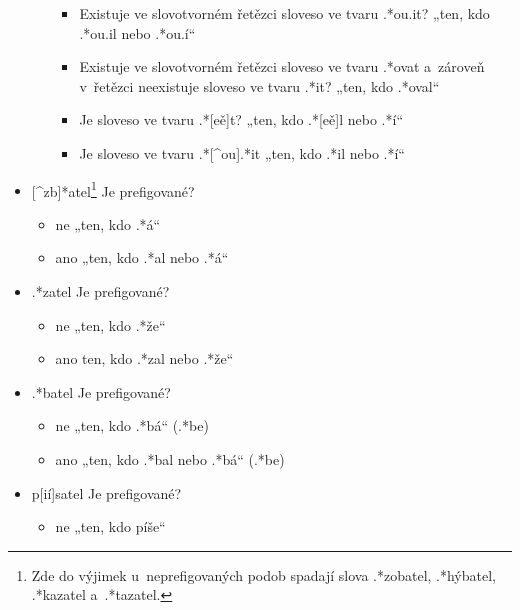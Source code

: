\begin{itemize}
\begin{itemize}
    \begin{itemize}
    \tightlist
    \item
      Existuje ve slovotvorném řetězci sloveso ve tvaru .*ou.it?
      \rightarrow „ten, kdo .*ou.il nebo .*ou.í``
    \item
      Existuje ve slovotvorném řetězci sloveso ve tvaru .*ovat a~zároveň
      v~řetězci neexistuje sloveso ve tvaru .*it? \rightarrow „ten,
      kdo .*oval``
    \item
      Je sloveso ve tvaru .*{[}eě{]}t? \rightarrow „ten, kdo
      .*{[}eě{]}l nebo .*í``
    \item
      Je sloveso ve tvaru .*{[}\^{}ou{]}.*it \rightarrow „ten, kdo
      .*il nebo .*í``
    \end{itemize}
  \end{itemize}
\item
  {[}\^{}zb{]}*atel\footnote{Zde do výjimek u~neprefigovaných podob spadají slova .*zobatel, .*hýbatel, .*kazatel a~.*tazatel.}
  \rightarrow Je prefigované?

  \begin{itemize}
  \tightlist
  \item
    ne \rightarrow „ten, kdo .*á``
  \item
    ano \rightarrow „ten, kdo .*al nebo .*á``
  \end{itemize}
\item
  .*zatel \rightarrow Je prefigované?

  \begin{itemize}
  \tightlist
  \item
    ne \rightarrow „ten, kdo .*že``
  \item
    ano \rightarrow ten, kdo .*zal nebo .*že``
  \end{itemize}
\item
  .*batel \rightarrow Je prefigované?

  \begin{itemize}
  \tightlist
  \item
    ne \rightarrow „ten, kdo .*bá`` (.*be)
  \item
    ano \rightarrow „ten, kdo .*bal nebo .*bá`` (.*be)
  \end{itemize}
\item
  p{[}ií{]}satel \rightarrow Je prefigované?

  \begin{itemize}
  \tightlist
  \item
    ne \rightarrow „ten, kdo píše``
  \end{itemize}
\end{itemize}

